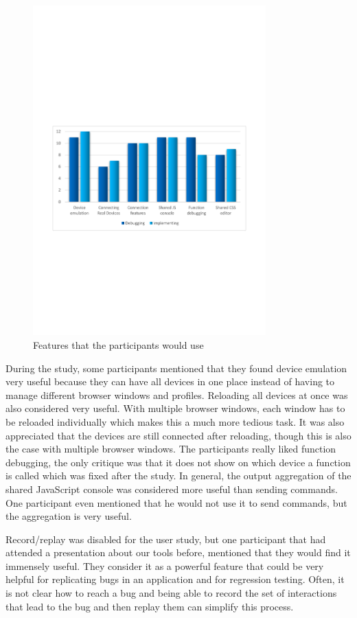 \begin{figure}[H]
  \centering
    \includegraphics[width=0.8\textwidth]{images/charts/would_use_features.pdf}
	\caption{Features that the participants would use}
	\label{fig:would_use_features}
\end{figure}

During the study, some participants mentioned that they found device emulation very useful because they can have all devices in one place instead of having to manage different browser windows and profiles. Reloading all devices at once was also considered very useful. With multiple browser windows, each window has to be reloaded individually which makes this a much more tedious task. It was also appreciated that the devices are still connected after reloading, though this is also the case with multiple browser windows. The participants really liked function debugging, the only critique was that it does not show on which device a function is called which was fixed after the study. In general, the output aggregation of the shared JavaScript console was considered more useful than sending commands. One participant even mentioned that he would not use it to send commands, but the aggregation is very useful. 

Record/replay was disabled for the user study, but one participant that had attended a presentation about our tools before, mentioned that they would find it immensely useful. They consider it as a powerful feature that could be very helpful for replicating bugs in an application and for regression testing. Often, it is not clear how to reach a bug and being able to record the set of interactions that lead to the bug and then replay them can simplify this process.